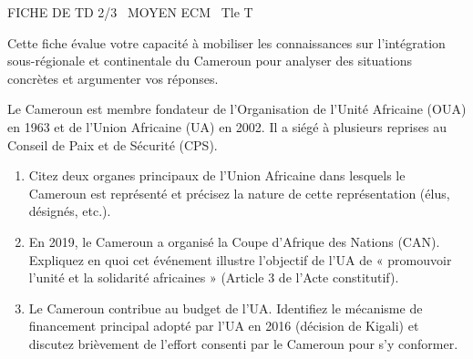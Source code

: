 \documentclass[11pt]{article}
\begin{document}
\begin{tcolorbox}[enhanced,colback=popink,colframe=popink,arc=10pt,boxrule=0pt,left=12pt,right=12pt,top=9pt,bottom=9pt]
{\color{white}\popxbold\small FICHE DE TD 2/3 \textbullet\ MOYEN \hfill ECM \textbullet\ Tle T\par}
\end{tcolorbox}
\vspace{4pt}
Cette fiche évalue votre capacité à mobiliser les connaissances sur l'intégration sous-régionale et continentale du Cameroun pour analyser des situations concrètes et argumenter vos réponses.

\begin{exercice}
Le Cameroun est membre fondateur de l'Organisation de l'Unité Africaine (OUA) en 1963 et de l'Union Africaine (UA) en 2002. Il a siégé à plusieurs reprises au Conseil de Paix et de Sécurité (CPS).
\begin{enumerate}
    \item Citez deux organes principaux de l'Union Africaine dans lesquels le Cameroun est représenté et précisez la nature de cette représentation (élus, désignés, etc.).
    \item En 2019, le Cameroun a organisé la Coupe d'Afrique des Nations (CAN). Expliquez en quoi cet événement illustre l'objectif de l'UA de « promouvoir l'unité et la solidarité africaines » (Article 3 de l'Acte constitutif).
    \item Le Cameroun contribue au budget de l'UA. Identifiez le mécanisme de financement principal adopté par l'UA en 2016 (décision de Kigali) et discutez brièvement de l'effort consenti par le Cameroun pour s'y conformer.
\end{enumerate}
\end{exercice}
\end{document}
